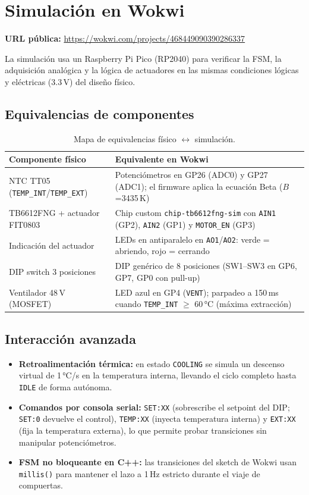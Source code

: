 \documentclass[11pt,letterpaper]{article}
\begin{document}
\section{Simulación en Wokwi}
\textbf{URL pública:} \url{https://wokwi.com/projects/468449090390286337}

La simulación usa un Raspberry Pi Pico (RP2040) para verificar la FSM, la adquisición
analógica y la lógica de actuadores en las mismas condiciones lógicas y eléctricas
(3.3\,V) del diseño físico.

\subsection{Equivalencias de componentes}
\begin{table}[H]
\centering\small
{}
\begin{tabularx}{\textwidth}{L{4.6cm} X}
\toprule
{}\color{white}\textbf{Componente físico} & \color{white}\textbf{Equivalente en Wokwi} \\
\midrule
NTC TT05 (\texttt{TEMP\_INT}/\texttt{TEMP\_EXT}) & Potenciómetros en GP26 (ADC0) y GP27 (ADC1); el firmware aplica la ecuación Beta ($B$=3435\,K) \\
TB6612FNG + actuador FIT0803 & Chip custom \texttt{chip-tb6612fng-sim} con \texttt{AIN1} (GP2), \texttt{AIN2} (GP1) y \texttt{MOTOR\_EN} (GP3) \\
Indicación del actuador & LEDs en antiparalelo en \texttt{AO1}/\texttt{AO2}: verde = abriendo, rojo = cerrando \\
DIP switch 3 posiciones & DIP genérico de 8 posiciones (SW1--SW3 en GP6, GP7, GP0 con pull-up) \\
Ventilador 48\,V (MOSFET) & LED azul en GP4 (\texttt{VENT}); parpadeo a 150\,ms cuando \texttt{TEMP\_INT} $\geq$ 60\,°C (máxima extracción) \\
\bottomrule
\end{tabularx}
\caption{Mapa de equivalencias físico $\leftrightarrow$ simulación.}
\end{table}

\subsection{Interacción avanzada}
\begin{itemize}
  \item \textbf{Retroalimentación térmica:} en estado \texttt{COOLING} se simula un descenso virtual de 1\,°C/s en la temperatura interna, llevando el ciclo completo hasta \texttt{IDLE} de forma autónoma.
  \item \textbf{Comandos por consola serial:} \texttt{SET:XX} (sobrescribe el setpoint del DIP; \texttt{SET:0} devuelve el control), \texttt{TEMP:XX} (inyecta temperatura interna) y \texttt{EXT:XX} (fija la temperatura externa), lo que permite probar transiciones sin manipular potenciómetros.
  \item \textbf{FSM no bloqueante en C++:} las transiciones del sketch de Wokwi usan \texttt{millis()} para mantener el lazo a 1\,Hz estricto durante el viaje de compuertas.
\end{itemize}
\end{document}
